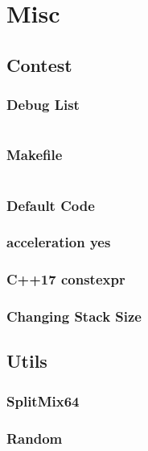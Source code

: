 \documentclass[10pt, a4paper, twocolumn, oneside]{article}
\begin{document}
\fontsize{7.2pt}{9pt}\selectfont

\tableofcontents
\newpage

\section{Misc}
    \subsection{Contest}
        \subsubsection{Debug List}
            \inputminted{md}{content/misc/debug-list.txt}
        \subsubsection{Makefile}
            \inputminted{makefile}{content/misc/makefile}
        \subsubsection{Default Code}
        \subsubsection{acceleration yes}
        \subsubsection{C++17 constexpr}
        \subsubsection{Changing Stack Size}
    \subsection{Utils}
        \subsubsection{SplitMix64}
        \subsubsection{Random}
\end{document}
